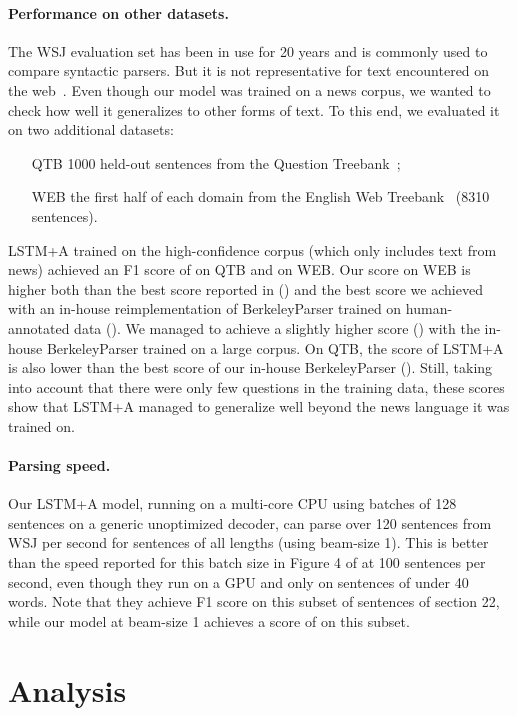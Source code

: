 \documentclass{article} \usepackage{nips15submit_e,times}
\newcommand\citep\cite
\begin{document}
\paragraph{Performance on other datasets.}
The WSJ evaluation set has been in use for 20 years and is commonly used
to compare syntactic parsers. But it is not representative for text
encountered on the web~\citep{petrov-mcdonald:2012:SANCL}. Even though
our model was trained on a news corpus, we wanted to check how well it
generalizes to other forms of text. To this end, we evaluated it on two
additional datasets:
\begin{itemize}
\item[QTB] 1000 held-out sentences from the Question
  Treebank~\cite{judge-etAl:2006:ACL};
\item[WEB] the first half of each domain from the English Web
  Treebank~\cite{petrov-mcdonald:2012:SANCL} (8310 sentences).
\end{itemize}
LSTM+A trained on the high-confidence corpus (which only includes text from
news) achieved an F1 score of  on QTB and  on WEB.
Our score on WEB is higher both than the best score reported
in \cite{petrov-mcdonald:2012:SANCL} () and the best score
we achieved with an in-house reimplementation of BerkeleyParser trained
on human-annotated data (). We managed to achieve a slightly higher
score () with the in-house BerkeleyParser trained on a large corpus.
On QTB, the  score of LSTM+A is also lower than the best score of
our in-house BerkeleyParser (). Still, taking into account that there
were only few questions in the training data, these scores show that
LSTM+A managed to generalize well beyond the news language it was trained on.

\paragraph{Parsing speed.}
Our LSTM+A model, running on a multi-core CPU using batches of 128 sentences
on a generic unoptimized decoder, can parse over 120 sentences from WSJ per second
for sentences of all lengths (using beam-size 1). This is better than the speed
reported for this batch size in Figure 4 of \citep{hall2014sparser} at 100 sentences
per second, even though they run on a GPU and only on sentences of under 40 words.
Note that they achieve  F1 score on this subset of sentences of section 22,
while our model at beam-size 1 achieves a score of  on this subset.
 \vspace{-0mm}
\section{Analysis}
\label{sec:analysis}
\end{document}
